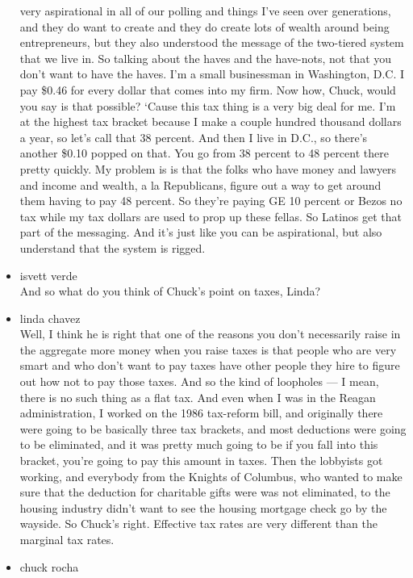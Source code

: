 \begin{itemize}
  very aspirational in all of our polling and things I've seen over
  generations, and they do want to create and they do create lots of
  wealth around being entrepreneurs, but they also understood the
  message of the two-tiered system that we live in. So talking about the
  haves and the have-nots, not that you don't want to have the haves.
  I'm a small businessman in Washington, D.C. I pay \$0.46 for every
  dollar that comes into my firm. Now how, Chuck, would you say is that
  possible? `Cause this tax thing is a very big deal for me. I'm at the
  highest tax bracket because I make a couple hundred thousand dollars a
  year, so let's call that 38 percent. And then I live in D.C., so
  there's another \$0.10 popped on that. You go from 38 percent to 48
  percent there pretty quickly. My problem is is that the folks who have
  money and lawyers and income and wealth, a la Republicans, figure out
  a way to get around them having to pay 48 percent. So they're paying
  GE 10 percent or Bezos no tax while my tax dollars are used to prop up
  these fellas. So Latinos get that part of the messaging. And it's just
  like you can be aspirational, but also understand that the system is
  rigged.
\item
  isvett verde\\
  And so what do you think of Chuck's point on taxes, Linda?
\item
  linda chavez\\
  Well, I think he is right that one of the reasons you don't
  necessarily raise in the aggregate more money when you raise taxes is
  that people who are very smart and who don't want to pay taxes have
  other people they hire to figure out how not to pay those taxes. And
  so the kind of loopholes --- I mean, there is no such thing as a flat
  tax. And even when I was in the Reagan administration, I worked on the
  1986 tax-reform bill, and originally there were going to be basically
  three tax brackets, and most deductions were going to be eliminated,
  and it was pretty much going to be if you fall into this bracket,
  you're going to pay this amount in taxes. Then the lobbyists got
  working, and everybody from the Knights of Columbus, who wanted to
  make sure that the deduction for charitable gifts were was not
  eliminated, to the housing industry didn't want to see the housing
  mortgage check go by the wayside. So Chuck's right. Effective tax
  rates are very different than the marginal tax rates.
\item
  chuck rocha\\

\end{itemize}
